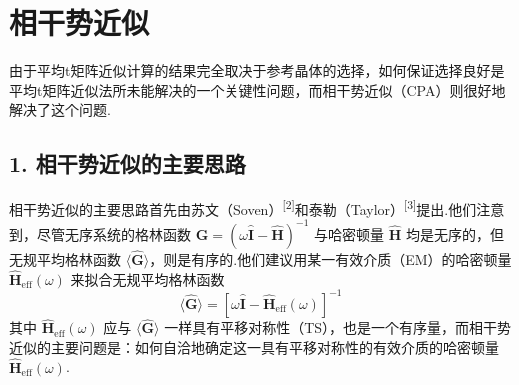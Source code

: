\section{相干势近似}

由于平均t矩阵近似计算的结果完全取决于参考晶体的选择，如何保证选择良好是平均t矩阵近似法所未能解决的一个关键性问题，而相干势近似（CPA）则很好地解决了这个问题.

\subsection*{1. 相干势近似的主要思路}

相干势近似的主要思路首先由苏文（Soven）\textsuperscript{[2]}和泰勒（Taylor）\textsuperscript{[3]}提出.他们注意到，尽管无序系统的格林函数 $\hat{\boldsymbol{G}}=\left(\omega\hat{\boldsymbol{I}}-\hat{\boldsymbol{H}}\right)^{-1}$ 与哈密顿量 $\hat{\boldsymbol{H}}$ 均是无序的，但无规平均格林函数 $\langle\hat{\boldsymbol{G}}\rangle$，则是有序的.他们建议用某一有效介质（EM）的哈密顿量 $\hat{\boldsymbol{H}}_{\mathrm{eff}}\left(\omega\right)$ 来拟合无规平均格林函数
\begin{equation}
  \langle\hat{\boldsymbol{G}}\rangle=\left[\omega\hat{\boldsymbol{I}}-\hat{\boldsymbol{H}}_{\mathrm{eff}}\left(\omega\right)\right]^{-1}
\end{equation}
其中 $\hat{\boldsymbol{H}}_{\mathrm{eff}}\left(\omega\right)$ 应与 $\langle\hat{\boldsymbol{G}}\rangle$ 一样具有平移对称性（TS），也是一个有序量，而相干势近似的主要问题是：如何自洽地确定这一具有平移对称性的有效介质的哈密顿量 $\hat{\boldsymbol{H}}_{\mathrm{eff}}\left(\omega\right)$.

